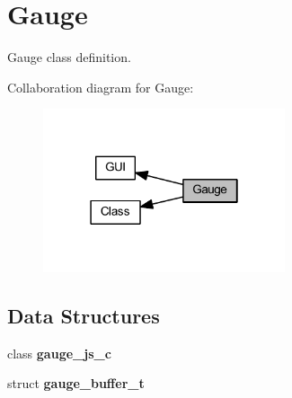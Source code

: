 \section{Gauge}
\label{group___gauge}


Gauge class definition.  


Collaboration diagram for Gauge\+:
\nopagebreak
\begin{figure}[H]
\begin{center}
\leavevmode
\includegraphics[width=202pt]{group___gauge}
\end{center}
\end{figure}
\subsection*{Data Structures}
\begin{DoxyCompactItemize}
\item 
class \textbf{ gauge\+\_\+js\+\_\+c}
\item 
struct \textbf{ gauge\+\_\+buffer\+\_\+t}
\end{DoxyCompactItemize}
